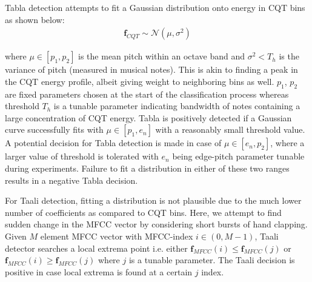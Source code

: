 \documentclass{article}
\begin{document}
Tabla detection attempts to fit a Gaussian distribution onto energy in CQT bins as shown below:
\begin{align}\label{eq:eq8}
\boldsymbol{f}_{CQT} \sim \mathcal{N}(\mu, \sigma^{2})
\end{align}

where $\mu \in [p_{1}, p_{2}]$ is the mean pitch within an octave band and $\sigma^{2} < T_{h}$ is the variance of pitch (measured in musical notes). This is akin to finding a peak in the CQT energy profile, albeit giving weight to neighboring bins as well. $p_{1}$, $p_{2}$ are fixed parameters chosen at the start of the classification process whereas threshold $T_{h}$ is a tunable parameter indicating bandwidth of notes containing a large concentration of CQT energy. Tabla is positively detected if a Gaussian curve successfully fits with $\mu \in [p_{1}, e_{n}]$ with a reasonably small threshold value. A potential decision for Tabla detection is made in case of $\mu \in [e_{n}, p_{2}]$, where a larger value of threshold is tolerated with $e_{n}$ being edge-pitch parameter tunable during experiments.  Failure to fit a distribution in either of these two ranges results in a negative Tabla decision.

For Taali detection, fitting a distribution is not plausible due to the much lower number of coefficients as compared to CQT bins. Here, we attempt to find sudden change in the MFCC vector by considering short bursts of hand clapping. Given $M$ element MFCC vector with MFCC-index $i \in (0, M-1)$, Taali detector searches a local extrema point i.e. either $\boldsymbol{f}_{MFCC}(i) \leq \boldsymbol{f}_{MFCC}(j)$ or $\boldsymbol{f}_{MFCC}(i) \geq \boldsymbol{f}_{MFCC}(j)$ where $j$ is a tunable parameter. The Taali decision is positive in case local extrema is found at a certain $j$ index.
\end{document}
